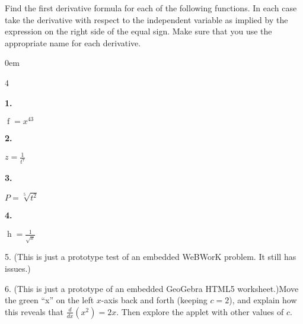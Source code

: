 \documentclass[12pt,]{book}
\theoremstyle{plain}
\theoremstyle{definition}
\numberwithin{equation}{section}
\newenvironment{exercisegroup}%
{\medskip\noindent}%
{\par\bigskip}%
\newlength{\exercisegroupindent}%
\newlength{\exercisegroupitemwidth}%
\newenvironment{exercisegrouplist}%
{\vspace{-\partopsep}%
\begin{adjustwidth}{\exercisegroupindent}{0em}}%
{\end{adjustwidth}%
\vspace{-\partopsep}%
\vspace{\baselineskip}}%
\newenvironment{exercisegroupbycol}[1]%
{\begin{exercisegrouplist}%
\vspace{-\multicolsep}%
\begin{multicols}{#1}%
\setlength{\parindent}{0em}%
\setlength{\exercisegroupitemwidth}{\linewidth}}%
{\end{multicols}%
\vspace{-\multicolsep}%
\end{exercisegrouplist}}%
\newenvironment{exercisegroupitem}[1]%
{\begin{minipage}[t]{\exercisegroupitemwidth}
\vspace{0pt}%
{\bfseries#1}%
\rule{0pt}{\baselineskip}}{\strut%
\end{minipage}%
\hspace{\columnsep}}%
\providecommand\phantomsection{}
\newcommand{\fe}[2]{\mathop{{#1}{\left(#2\right)}}}
\newcommand{\lzoo}[2]{{\frac{d}{d#1}}{\left(#2\right)}}
\begin{document}
\begin{exercisegroup}%
Find the first derivative formula for each of the following functions.  In each case take the derivative with respect to the independent variable as implied by the expression on the right side of the equal sign.  Make sure that you use the appropriate name for each derivative.%
\par
\begin{exercisegroupbycol}{4}%
\begin{exercisegroupitem}{1. }\phantomsection\hypertarget{exercise-287}{\null}
\(\fe{f}{x}=x^{43}\)%
\end{exercisegroupitem}%
\par%
\begin{exercisegroupitem}{2. }\phantomsection\hypertarget{exercise-288}{\null}
\(z=\frac{1}{t^{7}}\)%
\end{exercisegroupitem}%
\par%
\begin{exercisegroupitem}{3. }\phantomsection\hypertarget{exercise-289}{\null}
\(P=\sqrt[5]{t^2}\)%
\end{exercisegroupitem}%
\par%
\begin{exercisegroupitem}{4. }\phantomsection\hypertarget{exercise-290}{\null}
\(\fe{h}{x}=\frac{1}{\sqrt{x}}\)%
\end{exercisegroupitem}%
\par%
\end{exercisegroupbycol}%
\end{exercisegroup}%
\begin{exerciselist}
\item[5.]\phantomsection\hypertarget{exercise-291}{\null}(This is just a prototype test of an embedded WeBWorK problem. It still has issues.)\space\space{}\par\smallskip
\item[6.]\phantomsection\hypertarget{exercise-292}{\null}(This is just a prototype of an embedded GeoGebra HTML5 worksheet.)\space\space{}Move the green ``x'' on the left \(x\)-axis back and forth (keeping \(c=2\)), and explain how this reveals that \(\lzoo{x}{x^2}=2x\). Then explore the applet with other values of \(c\).%
\par\smallskip
\end{exerciselist}
\typeout{************************************************}
\typeout{************************************************}
\end{document}
